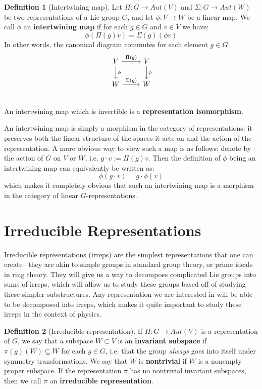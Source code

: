 \documentclass[11pt, oneside]{article}   	%
\theoremstyle{definition}
\newtheorem{definition}{Definition}[section]
\begin{document}
\begin{definition}[Intertwining map]
	Let $\Pi : G\rightarrow Aut(V)$ and $\Sigma : G\rightarrow Aut(W)$ be two representations of a Lie group $G$, 
	and let $\phi : V\rightarrow W$ be a linear map. We call $\phi$ an \textbf{intertwining map} if for each $g\in G$ 
	and $v\in V$ we have:
	\begin{equation}
		\phi(\Pi(g) v) = \Sigma(g) (\phi v)
	\end{equation}
	In other words, the canonical diagram commutes for each element $g\in G$:
	\[\begin{tikzcd}
		V\arrow[r, "\Pi(g)"]\arrow[d, "\phi"] & V\arrow[d, "\phi"] \\
		W\arrow[r, "\Sigma(g)"] & W \\
	\end{tikzcd}\]
	An intertwining map which is invertible is a \textbf{representation isomorphism}. 
\end{definition}

An intertwining map is simply a morphism in the category of representations: it preserves both the linear 
structure of the spaces it acts on and the action of the representation. A more obvious way to view such a map 
is as follows: denote by $\cdot$ the action of $G$ on $V$ or $W$, i.e. $g\cdot v := \Pi(g)v$. Then the definition of 
$\phi$ being an intertwining map can equivalently be written as:
\begin{equation}
	\phi(g\cdot v) = g\cdot \phi(v)
\end{equation}
which makes it completely obvious that such an intertwining map is a morphism in the category of linear 
$G$-representations. 

\newpage
\section{Irreducible Representations}

Irreducible representations (irreps) are the simplest representations that one can create-- they are 
akin to simple groups in standard group theory, or prime ideals in ring theory. They will give us a way 
to decompose complicated Lie groups into sums of irreps, which will allow us to study these groups based 
off of studying these simpler substructures. Any representation we are interested in will be able to be 
decomposed into irreps, which makes it quite important to study these irreps in the context of physics. 

\begin{definition}[Irreducible representation]
If $\Pi : G\rightarrow Aut(V)$ is a representation of $G$, we say that a subspace $W\subset V$ is 
an \textbf{invariant subspace} if $\pi(g)(W)\subseteq W$ for each $g\in G$, i.e. that the group 
\textit{always} goes into itself under symmetry transformations. We say that $W$ is \textbf{nontrivial} 
if $W$ is a nonempty proper subspace. If the representation $\pi$ has no nontrivial invariant subspaces, 
then we call $\pi$ an \textbf{irreducible representation}. 
\end{definition}
\end{document}
